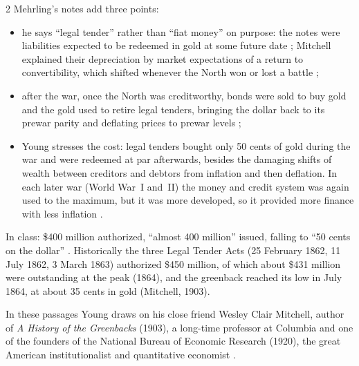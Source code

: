 \begin{paracol}{2}
Mehrling's notes add three points:
\begin{itemize}
  \item he says ``legal tender'' rather than ``fiat money'' on purpose: the notes were liabilities expected to be redeemed in gold at some future
        date ; Mitchell explained their depreciation by market expectations of a return to convertibility, which shifted whenever the North won
        or lost a battle ;
  \item after the war, once the North was creditworthy, bonds were sold to buy gold and the gold used to retire legal tenders, bringing the dollar
        back to its prewar parity and deflating prices to prewar levels ;
  \item Young stresses the cost: legal tenders bought only 50 cents of gold during the war and were redeemed at par afterwards, besides the
        damaging shifts of wealth between creditors and debtors from inflation and then deflation. In each later war (World War~I and~II) the money and
        credit system was again used to the maximum, but it was more developed, so it provided more finance with less inflation .
\end{itemize}

\begin{coursenote}[Numbers]
In class: \$400 million authorized, ``almost 400 million'' issued, falling to ``50 cents on the dollar'' .
Historically the three Legal Tender Acts (25 February 1862, 11 July 1862, 3 March 1863) authorized \$450 million, of which about
\$431 million were outstanding at the peak (1864), and the greenback reached its low in July 1864, at about 35 cents in gold
(Mitchell, 1903).
\end{coursenote}\begin{aside}
In these passages Young draws on his close friend Wesley Clair Mitchell, author of \emph{A History of the Greenbacks} (1903),
a long-time professor at Columbia and one of the founders of the National Bureau of Economic Research (1920), the great American
institutionalist and quantitative economist .
\end{aside}


\end{paracol}
